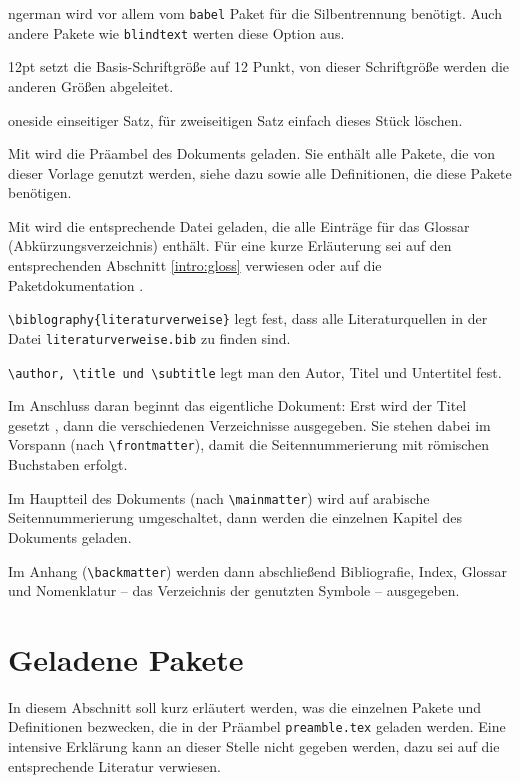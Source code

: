 \begin{compactdesc}
\item [ngerman] wird vor allem vom \texttt{babel} Paket für die Silbentrennung benötigt. Auch andere Pakete wie \texttt{blindtext} werten diese Option aus.
\item [12pt] setzt die Basis-Schriftgröße auf 12 Punkt, von dieser Schriftgröße werden die anderen Größen abgeleitet.
\item [oneside] einseitiger Satz, für zweiseitigen Satz einfach dieses Stück löschen.
\end{compactdesc}

Mit \verb|| wird die Präambel des Dokuments geladen. Sie enthält alle Pakete, die von dieser Vorlage genutzt werden, siehe dazu  sowie alle Definitionen, die diese Pakete benötigen.

Mit  \verb|| wird die entsprechende Datei geladen, die alle Einträge für das Glossar (Abkürzungsverzeichnis) enthält. Für eine kurze Erläuterung sei auf den entsprechenden Abschnitt \ref{intro:gloss} verwiesen oder auf die Paketdokumentation .

\verb|\biblography{literaturverweise}| legt fest, dass alle Literaturquellen in der Datei \texttt{literaturverweise.bib} zu finden sind.

\verb|\author, \title und \subtitle| legt man den Autor, Titel und Untertitel fest.

Im Anschluss daran beginnt das eigentliche Dokument: Erst wird der Titel gesetzt , dann die verschiedenen Verzeichnisse ausgegeben. Sie stehen dabei im Vorspann (nach \verb|\frontmatter|), damit die Seitennummerierung mit römischen Buchstaben erfolgt.

Im Hauptteil des Dokuments (nach \verb|\mainmatter|) wird auf arabische Seitennummerierung umgeschaltet, dann werden die einzelnen Kapitel des Dokuments geladen.

Im Anhang (\verb|\backmatter|) werden dann abschließend Bibliografie, Index, Glossar und Nomenklatur -- das Verzeichnis der genutzten Symbole -- ausgegeben. 

\section{Geladene Pakete}\label{sec:loadedpackages}

In diesem Abschnitt soll kurz erläutert werden, was die einzelnen Pakete und Definitionen bezwecken, die in der Präambel \texttt{preamble.tex} geladen werden. Eine intensive Erklärung kann an dieser Stelle nicht gegeben werden, dazu sei auf die entsprechende Literatur verwiesen.

